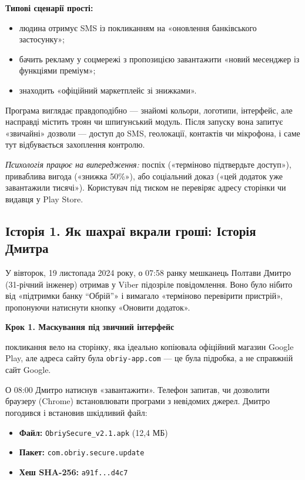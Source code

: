\vspace{0.3cm}

\textbf{Типові сценарії прості:}
\begin{itemize}
    \item людина отримує SMS із покликанням на «оновлення банківського застосунку»;
    \item бачить рекламу у соцмережі з пропозицією завантажити «новий месенджер із функціями преміум»;
    \item знаходить «офіційний маркетплейс зі знижками».
\end{itemize}

Програма виглядає правдоподібно — знайомі кольори, логотипи, інтерфейс, але насправді містить троян чи шпигунський модуль. Після запуску вона запитує «звичайні» дозволи — доступ до SMS, геолокації, контактів чи мікрофона, і саме тут відбувається захоплення контролю.

\textit{Психологія працює на випередження:} поспіх («терміново підтвердьте доступ»), приваблива вигода («знижка 50\%»), або соціальний доказ («цей додаток уже завантажили тисячі»). Користувач під тиском не перевіряє адресу сторінки чи видавця у Play Store.

\subsection*{Історія 1. Як шахраї вкрали гроші: Історія Дмитра}

У вівторок, 19 листопада 2024 року, о 07:58 ранку мешканець Полтави Дмитро (31-річний інженер) отримав у Viber підозріле повідомлення. Воно було нібито від «підтримки банку “Обрій”» і вимагало «терміново перевірити пристрій», пропонуючи натиснути кнопку «Оновити додаток».

\textbf{Крок 1. Маскування під звичний інтерфейс}

покликання вело на сторінку, яка ідеально копіювала офіційний магазин Google Play, але адреса сайту була \texttt{obriy-app.com} — це була підробка, а не справжній сайт Google.

О 08:00 Дмитро натиснув «завантажити». Телефон запитав, чи дозволити браузеру (Chrome) встановлювати програми з невідомих джерел. Дмитро погодився і встановив шкідливий файл:
\begin{itemize}
    \item \textbf{Файл:} \texttt{ObriySecure\_v2.1.apk} (12,4 МБ)
    \item \textbf{Пакет:} \texttt{com.obriy.secure.update}
    \item \textbf{Хеш SHA-256:} \texttt{a91f...d4c7}
\end{itemize}

